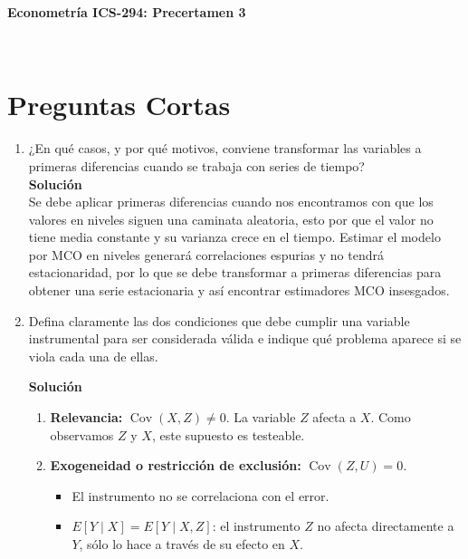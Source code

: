 \documentclass[10pt,a4paper]{article}
\begin{document}
\vspace{5cm}





\begin{center}
\begin{large}
\textbf{Econometría ICS-294: Precertamen 3}
\end{large}\\
\vspace{0.2cm}
\end{center}

\section{Preguntas Cortas }

\begin{enumerate}

\item  ¿En qué casos, y por qué motivos, conviene transformar las variables a primeras diferencias cuando se trabaja con series de tiempo?
\\
{\color{blue}\textbf{Solución}
\\
Se debe aplicar primeras diferencias cuando nos encontramos con que los valores en niveles siguen una caminata aleatoria, esto por que el valor no tiene media constante y su varianza crece en el tiempo. Estimar el modelo por MCO en niveles generará correlaciones espurias y no tendrá estacionaridad, por lo que se debe transformar a primeras diferencias para obtener una serie estacionaria y así encontrar estimadores MCO insesgados.}

\item  Defina claramente las dos condiciones que debe cumplir una variable instrumental para ser considerada válida e indique qué problema aparece si se viola cada una de ellas.  \\
{\color{blue}\textbf{Solución} 
\\
 \begin{enumerate}
        \item {\color{blue}\textbf{Relevancia:} }$\operatorname{Cov}(X, Z) \neq 0$. La variable $Z$ afecta a $X$. Como observamos $Z$ y $X$, este supuesto es testeable.
        \item  {\color{blue}\textbf{Exogeneidad o restricci\'on de exclusi\'on:}} $\operatorname{Cov}(Z, U)=0$. 
        \begin{itemize}
            \item El instrumento no se correlaciona con el error.
            \item $E[Y \mid X]=E[Y \mid X, Z]$: el instrumento $Z$ no afecta directamente a $Y$, s\'olo lo hace a trav\'es de su efecto en $X$.
        \end{itemize}
    \end{enumerate}

}
\end{enumerate}
\end{document}
